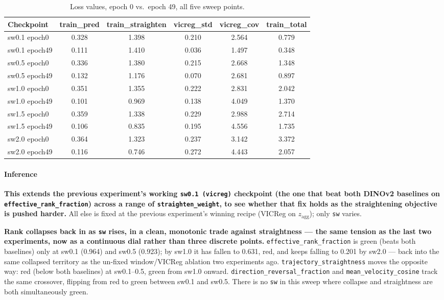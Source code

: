 \begin{table}[H]
\centering
\caption{Loss values, epoch 0 vs.\ epoch 49, all five sweep points.}
\label{tab:sw-sweep-losses}
\footnotesize
\begin{tabular}{lccccc}
\toprule
Checkpoint & train\_pred & train\_straighten & vicreg\_std & vicreg\_cov & train\_total \\
\midrule
sw0.1 epoch0 & 0.328 & 1.398 & 0.210 & 2.564 & 0.779 \\
sw0.1 epoch49 & 0.111 & 1.410 & 0.036 & 1.497 & 0.348 \\
sw0.5 epoch0 & 0.336 & 1.380 & 0.215 & 2.668 & 1.348 \\
sw0.5 epoch49 & 0.132 & 1.176 & 0.070 & 2.681 & 0.897 \\
sw1.0 epoch0 & 0.351 & 1.355 & 0.222 & 2.831 & 2.042 \\
sw1.0 epoch49 & 0.101 & 0.969 & 0.138 & 4.049 & 1.370 \\
sw1.5 epoch0 & 0.359 & 1.338 & 0.229 & 2.988 & 2.714 \\
sw1.5 epoch49 & 0.106 & 0.835 & 0.195 & 4.556 & 1.735 \\
sw2.0 epoch0 & 0.364 & 1.323 & 0.237 & 3.142 & 3.372 \\
sw2.0 epoch49 & 0.116 & 0.746 & 0.272 & 4.443 & 2.057 \\
\bottomrule
\end{tabular}
\end{table}

\paragraph{Inference}

\textbf{This extends the previous experiment's working \texttt{sw0.1 (vicreg)}
checkpoint (the one that beat both DINOv2 baselines on \texttt{effective\_rank\_fraction})
across a range of \texttt{straighten\_weight}, to see whether that fix holds as the
straightening objective is pushed harder.} All else is fixed at the previous
experiment's winning recipe (VICReg on $z_{\mathrm{agg}}$); only \texttt{sw} varies.

\textbf{Rank collapses back in as \texttt{sw} rises, in a clean, monotonic trade against
straightness --- the same tension as the last two experiments, now as a continuous
dial rather than three discrete points.} \texttt{effective\_rank\_fraction} is green
(beats both baselines) only at sw0.1 (0.964) and sw0.5 (0.923); by sw1.0 it has fallen
to 0.631, red, and keeps falling to 0.201 by sw2.0 --- back into the same collapsed
territory as the un-fixed window/VICReg ablation two experiments ago.
\texttt{trajectory\_straightness} moves the opposite way: red (below both baselines) at
sw0.1--0.5, green from sw1.0 onward. \texttt{direction\_reversal\_fraction} and
\texttt{mean\_velocity\_cosine} track the same crossover, flipping from red to green
between sw0.1 and sw0.5. There is no \texttt{sw} in this sweep where collapse and
straightness are both simultaneously green.

